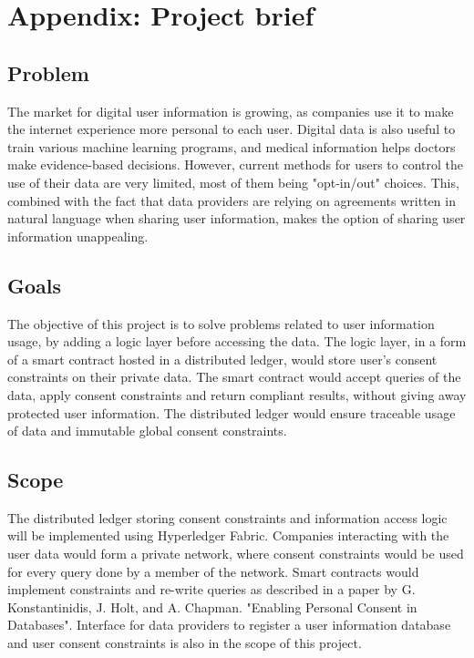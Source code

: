 \documentclass[12pt]{article}
\begin{document}
    \section{Appendix: Project brief}
    \subsection*{Problem}
    The market for digital user information is growing, as companies use it to make the internet experience more personal to each user. Digital data is also useful to train various machine learning programs, and medical information helps doctors make evidence-based decisions. However, current methods for users to control the use of their data are very limited, most of them being "opt-in/out" choices. This, combined with the fact that data providers are relying on agreements written in natural language when sharing user information, makes the option of sharing user information unappealing.


    \subsection*{Goals}
    The objective of this project is to solve problems related to user information usage, by adding a logic layer before accessing the data. The logic layer, in a form of a smart contract hosted in a distributed ledger, would store user's consent constraints on their private data. The smart contract would accept queries of the data, apply consent constraints and return compliant results, without giving away protected user information. The distributed ledger would ensure traceable usage of data and immutable global consent constraints.


    \subsection*{Scope}
    The distributed ledger storing consent constraints and information access logic will be implemented using Hyperledger Fabric. Companies interacting with the user data would form a private network, where consent constraints would be used for every query done by a member of the network. Smart contracts would implement constraints and re-write queries as described in a paper by G. Konstantinidis, J. Holt, and A. Chapman. "Enabling Personal Consent in Databases". Interface for data providers to register a user information database and user consent constraints is also in the scope of this project.
\end{document}
